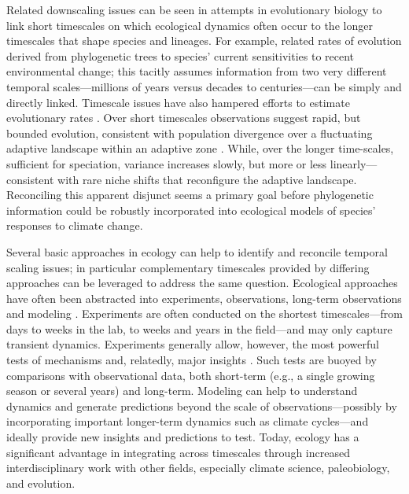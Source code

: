 \documentclass[11pt,a4paper,oneside]{article}
\begin{document}
Related downscaling issues can be seen in attempts in evolutionary biology to link short timescales on which ecological dynamics often occur to the longer timescales that shape species and lineages. For example, \citet{lavergne2013} related rates of evolution derived from phylogenetic trees to species' current sensitivities to recent environmental change; this tacitly assumes information from two very different temporal scales---millions of years versus decades to centuries---can be simply and directly linked. Timescale issues have also hampered efforts to estimate evolutionary rates \citep{schoener2011,Uyeda2011}. Over short timescales observations suggest rapid, but bounded evolution, consistent with population divergence over a fluctuating adaptive landscape within an adaptive zone
\citep{Uyeda2011}. While, over the longer time-scales, sufficient for speciation, variance increases slowly, but more or less linearly---consistent with rare niche shifts that reconfigure the adaptive landscape. Reconciling this apparent disjunct seems a primary goal before phylogenetic information could be robustly incorporated into ecological models of species' responses to climate change.

Several basic approaches in ecology can help to identify and reconcile temporal scaling issues; in particular complementary timescales provided by differing approaches can be leveraged to address the same question. Ecological approaches have often been abstracted into experiments, observations, long-term observations and modeling \citep{Carpenter:1992hk}. Experiments are often conducted on the shortest timescales---from days to weeks in the lab, to weeks and years in the field---and may only capture transient dynamics. Experiments generally allow, however, the most powerful tests of mechanisms and, relatedly, major insights \citep{Chapin:1995af,Wolkovich:2012n,Laube2014}. Such tests are buoyed by comparisons with observational data, both short-term (e.g., a single growing season or several years) and long-term. Modeling can help to understand dynamics and generate predictions beyond the scale of observations---possibly by incorporating important longer-term dynamics such as climate cycles---and ideally provide new insights and predictions to test. Today, ecology has a significant advantage in integrating across timescales through increased interdisciplinary work with other fields, especially climate science, paleobiology, and evolution.
\end{document}
